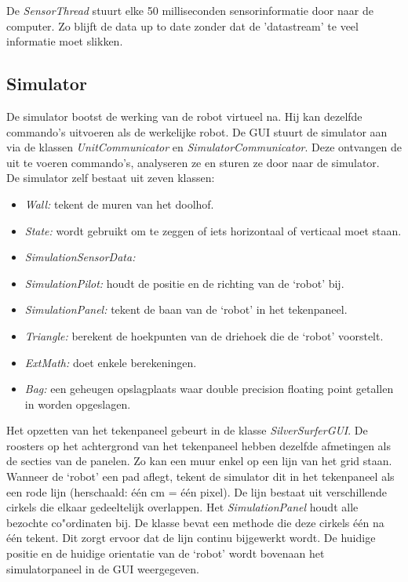 \documentclass[tt3]{penoverslag}
\begin{document}
De \textit{SensorThread} stuurt elke 50 milliseconden sensorinformatie door naar de computer. Zo blijft de data up to date zonder dat de 'datastream' te veel informatie moet slikken.

\subsection{Simulator} %
\label{ssec:simulator}
De simulator bootst de werking van de robot virtueel na. Hij kan dezelfde commando's uitvoeren als de werkelijke robot. De GUI stuurt de simulator aan via de klassen \textit{UnitCommunicator} en \textit{SimulatorCommunicator}. Deze ontvangen de uit te voeren commando's, analyseren ze en sturen ze door naar de simulator.
\\
De simulator zelf bestaat uit zeven klassen:

\begin{itemize}
\item \textit{Wall:} tekent de muren van het doolhof.
\item \textit{State:} wordt gebruikt om te zeggen of iets horizontaal of verticaal moet staan.
\item \textit{SimulationSensorData: }
\item \textit{SimulationPilot:} houdt de positie en de richting van de `robot' bij.
\item \textit{SimulationPanel:} tekent de baan van de `robot' in het tekenpaneel.
\item \textit{Triangle:} berekent de hoekpunten van de driehoek die de `robot' voorstelt.
\item \textit{ExtMath:} doet enkele berekeningen.
\item \textit{Bag:\cite{Bag.java} } een geheugen opslagplaats waar double precision floating point getallen in worden opgeslagen.
\end{itemize}

Het opzetten van het tekenpaneel gebeurt in de klasse \textit{SilverSurferGUI}. De roosters op het achtergrond van het tekenpaneel hebben dezelfde afmetingen als de secties van de panelen. Zo kan een muur enkel op een lijn van het grid staan.
Wanneer de `robot' een pad aflegt, tekent de simulator dit in het tekenpaneel als een rode lijn (herschaald: \'e\'en cm = \'e\'en pixel). De lijn  bestaat uit verschillende cirkels die elkaar gedeeltelijk overlappen. Het \textit{SimulationPanel} houdt alle bezochte co"ordinaten bij. De klasse bevat een methode die deze cirkels \'e\'en na \'e\'en tekent. Dit zorgt ervoor dat de lijn continu bijgewerkt wordt. De huidige positie en de huidige orientatie van de `robot' wordt bovenaan het simulatorpaneel in de GUI weergegeven.
\end{document}
